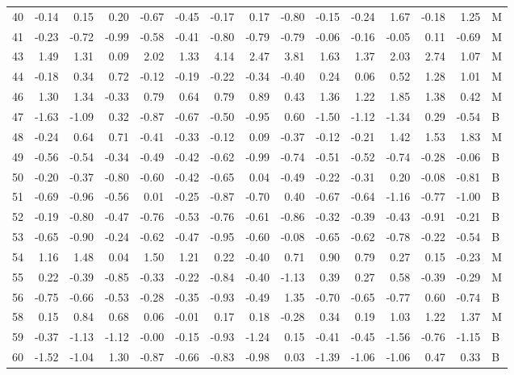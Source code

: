 \begin{table}[ht]
\begin{tabular}{rrrrrrrrrrrrrrl}
  40 & -0.14 & 0.15 & 0.20 & -0.67 & -0.45 & -0.17 & 0.17 & -0.80 & -0.15 & -0.24 & 1.67 & -0.18 & 1.25 & M \\ 
  41 & -0.23 & -0.72 & -0.99 & -0.58 & -0.41 & -0.80 & -0.79 & -0.79 & -0.06 & -0.16 & -0.05 & 0.11 & -0.69 & M \\ 
  43 & 1.49 & 1.31 & 0.09 & 2.02 & 1.33 & 4.14 & 2.47 & 3.81 & 1.63 & 1.37 & 2.03 & 2.74 & 1.07 & M \\ 
  44 & -0.18 & 0.34 & 0.72 & -0.12 & -0.19 & -0.22 & -0.34 & -0.40 & 0.24 & 0.06 & 0.52 & 1.28 & 1.01 & M \\ 
  46 & 1.30 & 1.34 & -0.33 & 0.79 & 0.64 & 0.79 & 0.89 & 0.43 & 1.36 & 1.22 & 1.85 & 1.38 & 0.42 & M \\ 
  47 & -1.63 & -1.09 & 0.32 & -0.87 & -0.67 & -0.50 & -0.95 & 0.60 & -1.50 & -1.12 & -1.34 & 0.29 & -0.54 & B \\ 
  48 & -0.24 & 0.64 & 0.71 & -0.41 & -0.33 & -0.12 & 0.09 & -0.37 & -0.12 & -0.21 & 1.42 & 1.53 & 1.83 & M \\ 
  49 & -0.56 & -0.54 & -0.34 & -0.49 & -0.42 & -0.62 & -0.99 & -0.74 & -0.51 & -0.52 & -0.74 & -0.28 & -0.06 & B \\ 
  50 & -0.20 & -0.37 & -0.80 & -0.60 & -0.42 & -0.65 & 0.04 & -0.49 & -0.22 & -0.31 & 0.20 & -0.08 & -0.81 & B \\ 
  51 & -0.69 & -0.96 & -0.56 & 0.01 & -0.25 & -0.87 & -0.70 & 0.40 & -0.67 & -0.64 & -1.16 & -0.77 & -1.00 & B \\ 
  52 & -0.19 & -0.80 & -0.47 & -0.76 & -0.53 & -0.76 & -0.61 & -0.86 & -0.32 & -0.39 & -0.43 & -0.91 & -0.21 & B \\ 
  53 & -0.65 & -0.90 & -0.24 & -0.62 & -0.47 & -0.95 & -0.60 & -0.08 & -0.65 & -0.62 & -0.78 & -0.22 & -0.54 & B \\ 
  54 & 1.16 & 1.48 & 0.04 & 1.50 & 1.21 & 0.22 & -0.40 & 0.71 & 0.90 & 0.79 & 0.27 & 0.15 & -0.23 & M \\ 
  55 & 0.22 & -0.39 & -0.85 & -0.33 & -0.22 & -0.84 & -0.40 & -1.13 & 0.39 & 0.27 & 0.58 & -0.39 & -0.29 & M \\ 
  56 & -0.75 & -0.66 & -0.53 & -0.28 & -0.35 & -0.93 & -0.49 & 1.35 & -0.70 & -0.65 & -0.77 & 0.60 & -0.74 & B \\ 
  58 & 0.15 & 0.84 & 0.68 & 0.06 & -0.01 & 0.17 & 0.18 & -0.28 & 0.34 & 0.19 & 1.03 & 1.22 & 1.37 & M \\ 
  59 & -0.37 & -1.13 & -1.12 & -0.00 & -0.15 & -0.93 & -1.24 & 0.15 & -0.41 & -0.45 & -1.56 & -0.76 & -1.15 & B \\ 
  60 & -1.52 & -1.04 & 1.30 & -0.87 & -0.66 & -0.83 & -0.98 & 0.03 & -1.39 & -1.06 & -1.06 & 0.47 & 0.33 & B \\ 

\end{tabular}
\end{table}
